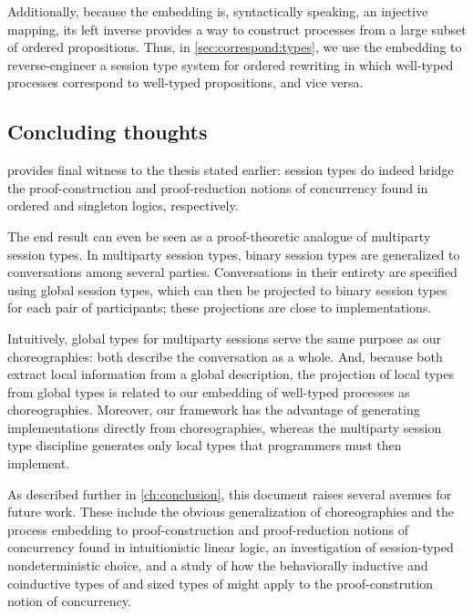 Additionally, because the embedding is, syntactically speaking, an injective mapping, its left inverse provides a way to construct processes from a large subset of ordered propositions.
Thus, in \cref{sec:correspond:types}, we use the embedding to reverse-engineer a session type system for ordered rewriting in which well-typed processes correspond to well-typed propositions, and vice versa.


\subsection{Concluding thoughts}

 provides final witness to the thesis stated earlier:
session types do indeed bridge the proof-construction and proof-reduction notions of concurrency found in ordered and singleton logics, respectively.

The end result can even be seen as a proof-theoretic analogue of multiparty session types.\autocite{Honda+:POPL08}
In multiparty session types, binary session types are generalized to conversations among several parties.
Conversations in their entirety are specified using global session types, which can then be projected to binary session types for each pair of participants; these projections are close to implementations.

Intuitively, global types for multiparty sessions serve the same purpose as our choreographies: both describe the conversation as a whole.
And, because both extract local information from a global description, the projection of local types from global types is related to our embedding of well-typed processes as choreographies.
Moreover, our framework has the advantage of generating implementations directly from choreographies, whereas the multiparty session type discipline generates only local types that programmers must then implement.

As described further in \cref{ch:conclusion}, this document raises several avenues for future work.
These include the obvious generalization of choreographies and the process embedding to proof-construction and proof-reduction notions of concurrency found in intuitionistic linear logic, an investigation of session-typed nondeterministic choice, and a study of how the behaviorally inductive and coinductive types of  and sized types of  might apply to the proof-constrution notion of concurrency.


